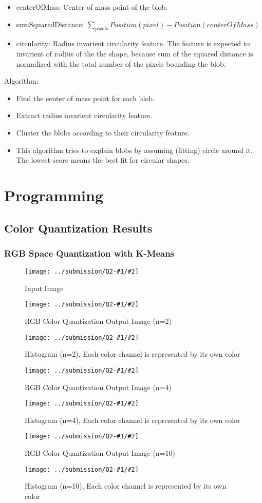 \documentclass{article}
\newcommand{\listFigure}[4]{
\begin{figure}[H]
	\texttt{[image: ../submission/Q2-\#1/\#2]}
	\caption{#3\label{fig:#4}}
\end{figure}		
}
\begin{document}
\begin{enumerate}
\begin{itemize}
		\item centerOfMass: Center of mass point of the blob.
		\item sumSquaredDistance:
		$\sum_{pixels}Position(pixel)-Position(centerOfMass)$
		\item circularity: Radius invarient circularity feature. The feature is
		expected to invarient of radius of the the shape, because sum of the squared
		distance is normalized with the total number of the pixels bounding the blob. 
	\end{itemize}
	Algorithm: \\
	\begin{itemize}
		\item Find the center of mass point for each blob.
		\item Extract radius invarient circularity feature.
		\item Cluster the blobs according to their circularity feature.
		\item This algorithm tries to explain blobs by assuming (fitting) circle
		around it. The lowest score means the best fit for circular shapes.
	\end{itemize}	
\end{enumerate}
\pagebreak

\label{Programming}
\section{Programming}
	\subsection{Color Quantization Results}
	\subsubsection{RGB Space Quantization with K-Means}
	\listFigure{1}{fish.jpg}{Input Image}{input}

	\listFigure{1}{RGB2.jpg}{RGB Color Quantization Output Image
	(n=2)}{outputRGB-n_2}
	\listFigure{1}{histRGB-nCluster2.png}{Histogram	(n=2),
	Each color channel is represented by its own color}{histRGB-n_2}
	
	
	\listFigure{1}{RGB4.jpg}{RGB Color Quantization Output Image
	(n=4)}{outputRGB-n_4}
	\listFigure{1}{histRGB-nCluster4.png}{Histogram	(n=4),
	Each color channel is represented by its own color}{histRGB-n_4}
	
	\listFigure{1}{RGB10.jpg}{RGB Color Quantization Output Image
	(n=10)}{outputRGB-n_10}  
	\listFigure{1}{histRGB-nCluster10.png}{Histogram (n=10), Each color
	channel is represented by its own color}{histRGB-n_10}
\end{document}
